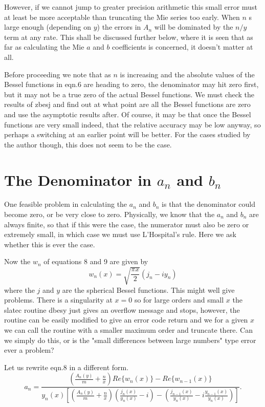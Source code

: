 \documentclass[12pt]{article}
\begin{document}
However, if we cannot jump to greater precision arithmetic
this small error must at least be more acceptable than truncating
the Mie series too early. When $n$ s large enough (depending on $y$)
the errors in $A_n$ will be dominated by the $n/y$ term at any rate.
 This shall be discussed further below, where it is seen that as far as calculating the 
Mie $a$ and $b$ coefficients is concerned, it doesn't matter at all.

Before proceeding we note that as $n$ is increasing and the absolute
values of the Bessel functions in eqn.6 are heading to zero, the 
denominator may hit zero first, but it may not be a true zero
of the actual Bessel functions. We must check the results of zbesj
and find out at what point are all the Bessel functions are zero
and use the asymptotic results after. Of course, it may be that 
once the Bessel functions are very small indeed, that the relative
accuracy may be low anyway, so perhaps a switching at an earlier
point will be better. For the cases studied by the author though, this does
not seem to be the case.

\section{The Denominator in $a_n$ and $b_n$}

One feasible problem in calculating the $a_n$ and $b_n$ is that the denominator
could become zero, or be very close to zero. Physically, we know that the $a_n$ and
$b_n$ are always finite, so that if this were the case, the numerator must also be zero
or extremely small, in which case we must use L'Hospital's rule. Here we ask whether this
is ever the case.

Now the $w_n$ of equations 8 and 9 are given by
\begin{equation}
w_n(x)=\sqrt{ \frac{\pi x}{2}  } (j_n - i y_n)
\end{equation}
where the $j$ and $y$ are  the spherical Bessel functions.
This might well give problems. There is a singularity at $x=0$
so for large orders and small $x$ the slatec routine dbesy just gives
an overflow message and stops, however, the routine can be easily modified
to give an error code return and we for a given $x$ we can call the routine
with a smaller maximum order and truncate there. Can we simply do this, or is
the "small differences between large numbers" type error ever a problem?

Let us rewrite eqn.8 in a different form.
\begin{equation}
a_n=\frac{ \left ( 
\frac{A_n(y)}{m}+\frac{n}{x}
 \right )
Re \lbrace w_n(x) \rbrace -Re \lbrace w_{n-1}(x) \rbrace
}
{ y_n(x) \left \lbrack \left ( 
\frac{A_n(y)}{m}+\frac{n}{x} 
\right )
 \left ( \frac{j_n(x)}{y_n(x)}-i \right )-
 \left (
\frac{j_{n-1}(x)}{y_n(x)}-i 
  \frac{y_{n-1}(x)}{y_n(x)} \right ) \right \rbrack
}.
\end{equation}
\end{document}
